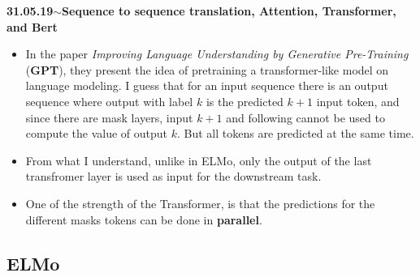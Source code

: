 \documentclass[11pt,a4paper]{article}
\newenvironment{loggentry}[2]%
{\noindent\textbf{#1}\hspace{1cm}$\mathbf{\sim}$\text{ }\textbf{#2}\\}{\vspace{0.5cm}}
\begin{document}
\begin{loggentry}{31.05.19}{Sequence to sequence translation, Attention, Transformer, and Bert}
\begin{itemize}
\url{https://github.com/openai/finetune-transformer-lm}\\
but unfortunately it is in tensorflow which is a pain in the ass.\\
\textbf{Edit (25.09.19):} Joram explained me that actually, what is used is indeed just the decoder part but the layers don't have the encoder-decoder attention sublayers. They keep the mask because it forces the model to have the ``auto-regressive" property, so in a sense, to predict one word after the other.
\item In the paper \textit{Improving Language Understanding by Generative Pre-Training} (\textbf{GPT}), they present the idea of pretraining a transformer-like model on language modeling. I guess that for an input sequence there is an output sequence where output with label $k$ is the predicted $k+1$ input token, and since there are mask layers, input $k+1$ and following cannot be used to compute the value of output $k$. But all tokens are predicted at the same time.
\item From what I understand, unlike in ELMo, only the output of the last transfromer layer is used as input for the downstream task.
\item One of the strength of the Transformer, is that the predictions for the different masks tokens can be done in \textbf{parallel}.
\end{itemize}


\subsection{ELMo}


\end{loggentry}
\end{document}
